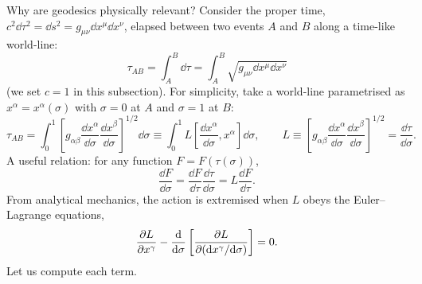 Why are geodesics physically relevant? Consider the proper time, $c^2\dd\tau^2=\dd s^2=g_{\mu\nu}\dd x^\mu\dd x^\nu$, elapsed between two events $A$ and $B$ along a time-like world-line:
\begin{equation}
  \tau_{AB}=\int_A^B\dd\tau=\int_A^B\sqrt{g_{\mu\nu}\dd x^\mu\dd x^\nu}
\end{equation}
(we set $c=1$ in this subsection). For simplicity, take a world-line parametrised as $x^\alpha=x^\alpha(\sigma)$ with $\sigma=0$ at $A$ and $\sigma=1$ at $B$:
\[
  \tau_{AB}=\int_0^1\left[g_{\alpha\beta}\frac{\dd x^\alpha}{\dd\sigma}\frac{\dd x^\beta}{\dd\sigma}\right]^{1/2}\dd\sigma\equiv\int_0^1 L\!\left[\frac{\dd x^\alpha}{\dd\sigma},x^\alpha\right]\dd\sigma ,
  \qquad L\equiv\left[g_{\alpha\beta}\frac{\dd x^\alpha}{\dd\sigma}\frac{\dd x^\beta}{\dd\sigma}\right]^{1/2}=\frac{\dd\tau}{\dd\sigma}.
\]
A useful relation: for any function $F=F(\tau(\sigma))$,
\begin{equation}
  \frac{\dd F}{\dd\sigma}=\frac{\dd F}{\dd\tau}\frac{\dd\tau}{\dd\sigma}=L\frac{\dd F}{\dd\tau}.\tag{$\ast$}
\end{equation}
From analytical mechanics, the action is extremised when $L$ obeys the Euler--Lagrange equations,
\[
  \frac{\partial L}{\partial x^\gamma}-\frac{\mathrm{d}}{\mathrm{d}\sigma}\left[\frac{\partial L}{\partial(\mathrm{d} x^\gamma/\mathrm{d}\sigma)}\right]=0 .
\]
Let us compute each term.

